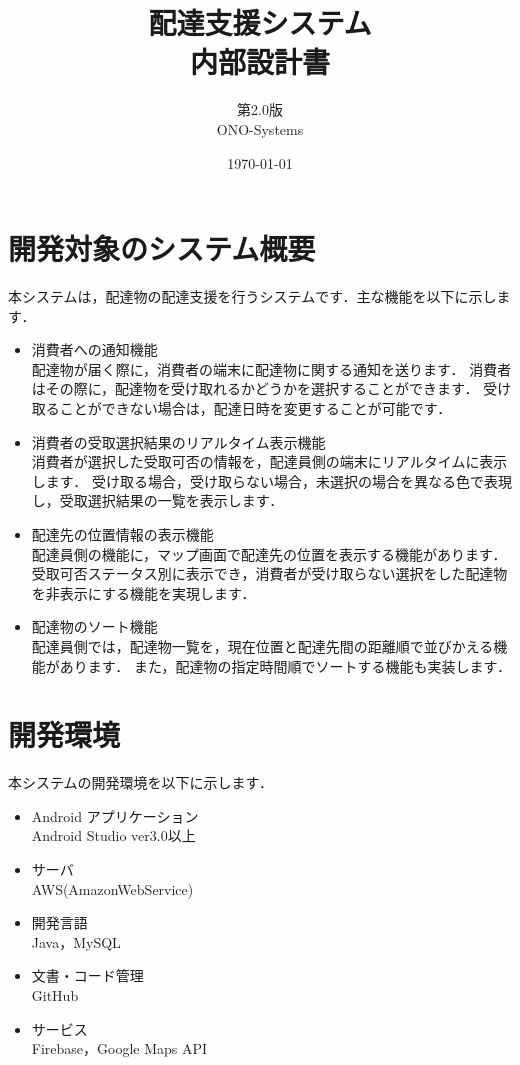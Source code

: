 \documentclass[a4j,titlepage]{jarticle}
\title{\huge 配達支援システム\\
		内部設計書}
\author{第2.0版\\
        ONO-Systems\\}
\date{\today}
\begin{document}
\maketitle

\tableofcontents
\clearpage


\section{開発対象のシステム概要}
本システムは，配達物の配達支援を行うシステムです．主な機能を以下に示します．
\begin{itemize}
\item 消費者への通知機能\\
  配達物が届く際に，消費者の端末に配達物に関する通知を送ります．
  消費者はその際に，配達物を受け取れるかどうかを選択することができます．
  受け取ることができない場合は，配達日時を変更することが可能です．
\item 消費者の受取選択結果のリアルタイム表示機能\\
  消費者が選択した受取可否の情報を，配達員側の端末にリアルタイムに表示します．
  受け取る場合，受け取らない場合，未選択の場合を異なる色で表現し，受取選択結果の一覧を表示します．
\item 配達先の位置情報の表示機能\\
  配達員側の機能に，マップ画面で配達先の位置を表示する機能があります．
  受取可否ステータス別に表示でき，消費者が受け取らない選択をした配達物を非表示にする機能を実現します．
\item 配達物のソート機能\\
  配達員側では，配達物一覧を，現在位置と配達先間の距離順で並びかえる機能があります．
  また，配達物の指定時間順でソートする機能も実装します．
\end{itemize}


\section{開発環境}
本システムの開発環境を以下に示します．
\begin{itemize}
\item Android アプリケーション\\
  Android Studio ver3.0以上
\item サーバ\\
  AWS(AmazonWebService)
\item 開発言語\\
  Java，MySQL
\item 文書・コード管理\\
  GitHub
\item サービス\\
  Firebase，Google Maps API
\end{itemize}
\end{document}
